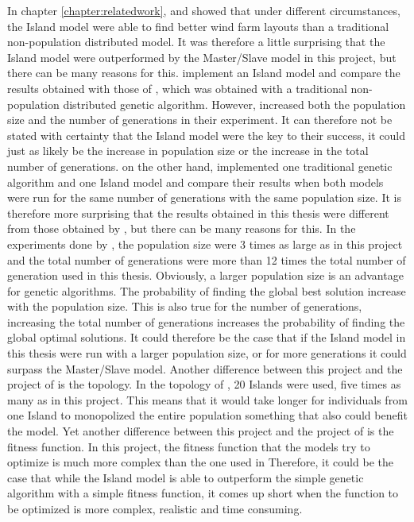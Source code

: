 \noindent In chapter \ref{chapter:relatedwork}, \cite{Grady} and \cite{Huang} showed that under different circumstances, the Island model were able to find better wind farm layouts than a traditional non-population distributed model. It was therefore a little surprising that the Island model were outperformed by the Master/Slave model in this project, but there can be many reasons for this. \cite{Grady} implement an Island model and compare the results obtained with those of \cite{Mosetti}, which was obtained with a traditional non-population distributed genetic algorithm. However, \cite{Grady} increased both the population size and the number of generations in their experiment. It can therefore not be stated with certainty that the Island model were the key to their success, it could just as likely be the increase in population size or the increase in the total number of generations. \cite{Huang} on the other hand, implemented one traditional genetic algorithm and one Island model and compare their results when both models were run for the same number of generations with the same population size. It is therefore more surprising that the results obtained in this thesis were different from those obtained by \cite{Huang}, but there can be many reasons for this. In the experiments done by \cite{Huang}, the population size were 3 times as large as in this project and the total number of generations were more than 12 times the total number of generation used in this thesis. Obviously, a larger population size is an advantage for genetic algorithms. The probability of finding the global best solution increase with the population size. This is also true for the number of generations, increasing the total number of generations increases the probability of finding the global optimal solutions. It could therefore be the case that if the Island model in this thesis were run with a larger population size, or for more generations it could surpass the Master/Slave model. Another difference between this project and the project of \cite{Huang} is the topology. In the topology of \cite{Huang}, 20 Islands were used, five times as many as in this project. This means that it would take longer for individuals from one Island to monopolized the entire population something that also could benefit the model. Yet another difference between this project and the project of \cite{Huang} is the fitness function. In this project, the fitness function that the models try to optimize is much more complex than the one used in \cite{Huang} Therefore, it could be the case that while the Island model is able to outperform the simple genetic algorithm with a simple fitness function, it comes up short when the function to be optimized is more complex, realistic and time consuming. \\

